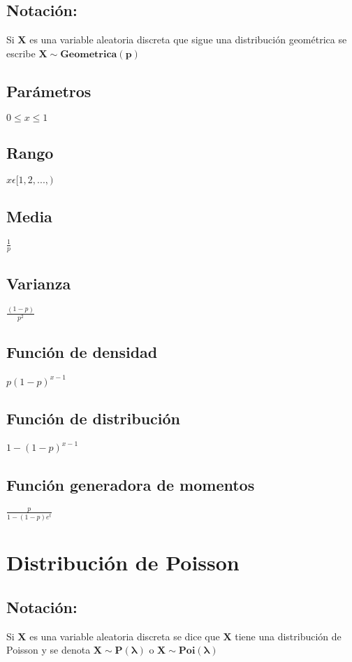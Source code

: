 \documentclass[es-lat]{article}
\begin{document}
\subsection{Notación:}

Si $\mathbf{X}$ es una variable aleatoria discreta que sigue una distribución geométrica se escribe $\mathbf{X\sim Geometrica(p)}$ 

\subsection{Parámetros}
$0 \leq  x \leq 1$

\subsection{Rango}
$x\epsilon [1,2,...,)$

\subsection{Media}
$\frac{1}{p}$

\subsection{Varianza}
$\frac{(1-p)}{p^2}$

\subsection{Función de densidad}
$p(1-p)^{x-1}$

\subsection{Función de distribución}
$1-(1-p)^{x-1}$

\subsection{Función generadora de momentos}
$\frac{p}{1-(1-p)e^t}$

\section{Distribución de Poisson}
\subsection{Notación:}

Si $\mathbf{X}$ es una variable aleatoria discreta se dice que $\mathbf{X}$ tiene una distribución de Poisson y se denota $\mathbf{X\sim P(\lambda)}$ o $\mathbf{X\sim Poi(\lambda)}$
\end{document}
